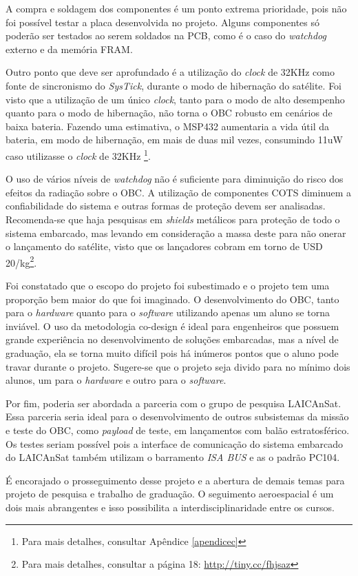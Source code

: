 A compra e soldagem dos componentes é um ponto extrema prioridade, pois não foi possível testar a placa desenvolvida no projeto. Alguns componentes só poderão ser testados ao serem soldados na PCB, como é o caso do \textit{watchdog} externo e da memória FRAM.

Outro ponto que deve ser aprofundado é a utilização do \textit{clock} de 32KHz como fonte de sincronismo do \textit{SysTick}, durante o modo de hibernação do satélite. Foi visto que a utilização de um único  \textit{clock}, tanto para o modo de alto desempenho quanto para o modo de hibernação, não torna o OBC robusto em cenários de baixa bateria. Fazendo uma estimativa, o MSP432 aumentaria a vida útil da bateria, em modo de hibernação, em mais de duas mil vezes, consumindo 11uW caso utilizasse o \textit{clock} de 32KHz \footnote{Para mais detalhes, consultar Apêndice \ref{apendicec}}.

O uso de vários níveis de \textit{watchdog} não é suficiente para diminuição do risco dos efeitos da radiação sobre o OBC. A utilização de componentes COTS diminuem a confiabilidade do sistema e outras formas de proteção devem ser analisadas. Recomenda-se que haja pesquisas em \textit{shields} metálicos para proteção de todo o sistema embarcado,  mas levando em consideração a massa  deste para não onerar o lançamento do satélite, visto que os lançadores cobram em torno de USD 20/kg\footnote{Para mais detalhes, consultar a página 18: \url{http://tiny.cc/fhjsaz}}.

Foi constatado que o escopo do projeto foi subestimado e o projeto tem uma proporção bem maior do que foi imaginado. O desenvolvimento do OBC, tanto para o \textit{hardware} quanto para o \textit{software} utilizando apenas um aluno se torna inviável. O uso da metodologia co-design é ideal para engenheiros que possuem grande experiência no desenvolvimento de soluções embarcadas, mas a nível de graduação, ela se torna muito difícil pois há inúmeros pontos que o aluno pode travar durante o projeto. Sugere-se que o projeto seja divido para no mínimo dois alunos, um para o \textit{hardware} e outro para o \textit{software}. 

Por fim, poderia ser abordada a parceria com o grupo de pesquisa LAICAnSat. Essa parceria seria ideal para o desenvolvimento de outros subsistemas da missão e teste do OBC, como \textit{payload} de teste, em lançamentos com balão estratosférico. Os testes seriam possível pois a interface de comunicação do sistema embarcado do LAICAnSat também utilizam o barramento \textit{ISA BUS} e as o padrão PC104. 

É encorajado o prosseguimento desse projeto e a abertura de demais temas para projeto de pesquisa e trabalho de graduação. O seguimento aeroespacial é um dois mais abrangentes e isso possibilita a interdisciplinaridade entre os cursos.
\FloatBarrier